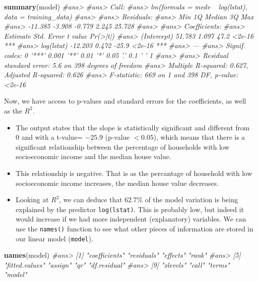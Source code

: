 \documentclass[]{book}
\newenvironment{Shaded}{\begin{snugshade}}{\end{snugshade}}
\newcommand{\KeywordTok}[1]{\textcolor[rgb]{0.13,0.29,0.53}{\textbf{#1}}}
\newcommand{\CommentTok}[1]{\textcolor[rgb]{0.56,0.35,0.01}{\textit{#1}}}
\newcommand{\NormalTok}[1]{#1}
\providecommand{\tightlist}{%
  \setlength{\itemsep}{0pt}\setlength{\parskip}{0pt}}
\theoremstyle{definition}
\theoremstyle{definition}
\theoremstyle{definition}
\theoremstyle{remark}
\begin{document}
\begin{Shaded}
\begin{Highlighting}[]
\KeywordTok{summary}\NormalTok{(model)}
\CommentTok{#ans> }
\CommentTok{#ans> Call:}
\CommentTok{#ans> lm(formula = medv ~ log(lstat), data = training_data)}
\CommentTok{#ans> }
\CommentTok{#ans> Residuals:}
\CommentTok{#ans>     Min      1Q  Median      3Q     Max }
\CommentTok{#ans> -11.385  -3.908  -0.779   2.245  25.728 }
\CommentTok{#ans> }
\CommentTok{#ans> Coefficients:}
\CommentTok{#ans>             Estimate Std. Error t value Pr(>|t|)    }
\CommentTok{#ans> (Intercept)   51.783      1.097    47.2   <2e-16 ***}
\CommentTok{#ans> log(lstat)   -12.203      0.472   -25.9   <2e-16 ***}
\CommentTok{#ans> ---}
\CommentTok{#ans> Signif. codes:  0 '***' 0.001 '**' 0.01 '*' 0.05 '.' 0.1 ' ' 1}
\CommentTok{#ans> }
\CommentTok{#ans> Residual standard error: 5.6 on 398 degrees of freedom}
\CommentTok{#ans> Multiple R-squared:  0.627,   Adjusted R-squared:  0.626 }
\CommentTok{#ans> F-statistic:  669 on 1 and 398 DF,  p-value: <2e-16}
\end{Highlighting}
\end{Shaded}

Now, we have access to p-values and standard errors for the
coefficients, as well as the \(R^2\).

\begin{itemize}
\tightlist
\item
  The output states that the slope is statistically significant and
  different from \(0\) and with a t-value= \(-25.9\) (p-value
  \(< 0.05\)), which means that there is a significant relationship
  between the percentage of households with low socioeconomic income and
  the median house value.
\item
  This relationship is negative. That is as the percantage of household
  with low socioeconomic income increases, the median house value
  decreases.
\item
  Looking at \(R^2\), we can deduce that \(62.7\%\) of the model
  variation is being explained by the predictor \texttt{log(lstat)}.
  This is probably low, but indeed it would increase if we had more
  independent (explanatory) variables. We can use the \texttt{names()}
  function to see what other pieces of information are stored in our
  linear model (\texttt{model}).
\end{itemize}

\begin{Shaded}
\begin{Highlighting}[]
\KeywordTok{names}\NormalTok{(model)}
\CommentTok{#ans>  [1] "coefficients"  "residuals"     "effects"       "rank"         }
\CommentTok{#ans>  [5] "fitted.values" "assign"        "qr"            "df.residual"  }
\CommentTok{#ans>  [9] "xlevels"       "call"          "terms"         "model"}
\end{Highlighting}
\end{Shaded}
\end{document}
